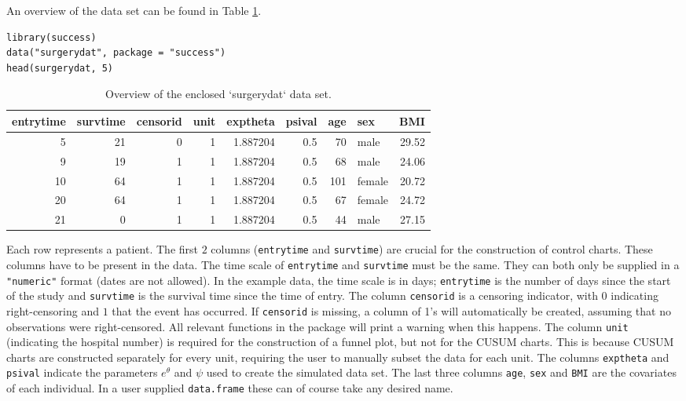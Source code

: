 An overview of the data set can be found in Table \ref{tab:surgerydat-static}.

\begin{verbatim}
library(success)
data("surgerydat", package = "success")
head(surgerydat, 5)
\end{verbatim}

\begin{table}

\caption{\label{tab:surgerydat-static}Overview of the enclosed `surgerydat` data set.}
\centering
\begin{tabular}[t]{r|r|r|r|r|r|r|l|r}
\hline
entrytime & survtime & censorid & unit & exptheta & psival & age & sex & BMI\\
\hline
5 & 21 & 0 & 1 & 1.887204 & 0.5 & 70 & male & 29.52\\
\hline
9 & 19 & 1 & 1 & 1.887204 & 0.5 & 68 & male & 24.06\\
\hline
10 & 64 & 1 & 1 & 1.887204 & 0.5 & 101 & female & 20.72\\
\hline
20 & 64 & 1 & 1 & 1.887204 & 0.5 & 67 & female & 24.72\\
\hline
21 & 0 & 1 & 1 & 1.887204 & 0.5 & 44 & male & 27.15\\
\hline
\end{tabular}
\end{table}

Each row represents a patient. The first \(2\) columns (\texttt{entrytime} and \texttt{survtime}) are crucial for the construction of control charts. These columns have to be present in the data. The time scale of \texttt{entrytime} and \texttt{survtime} must be the same. They can both only be supplied in a \texttt{"numeric"} format (dates are not allowed). In the example data, the time scale is in days; \texttt{entrytime} is the number of days since the start of the study and \texttt{survtime} is the survival time since the time of entry. The column \texttt{censorid} is a censoring indicator, with \(0\) indicating right-censoring and \(1\) that the event has occurred. If \texttt{censorid} is missing, a column of 1's will automatically be created, assuming that no observations were right-censored. All relevant functions in the package will print a warning when this happens. The column \texttt{unit} (indicating the hospital number) is required for the construction of a funnel plot, but not for the CUSUM charts. This is because CUSUM charts are constructed separately for every unit, requiring the user to manually subset the data for each unit. The columns \texttt{exptheta} and \texttt{psival} indicate the parameters \(e^{\theta}\) and \(\psi\) used to create the simulated data set. The last three columns \texttt{age}, \texttt{sex} and \texttt{BMI} are the covariates of each individual. In a user supplied \texttt{data.frame} these can of course take any desired name.

